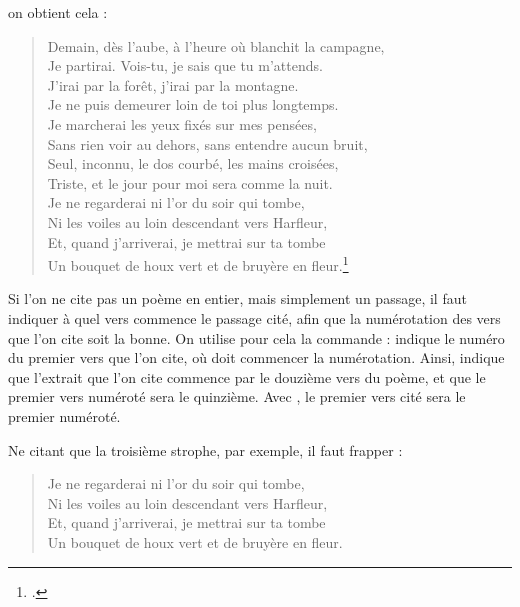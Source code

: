 on obtient cela :

\begin{verse}

Demain, dès l'aube, à l'heure où blanchit la campagne,\\
Je partirai. Vois-tu, je sais que tu m'attends.\\
J'irai par la forêt, j'irai par la montagne.\\
Je ne puis demeurer loin de toi plus longtemps.\\

Je marcherai les yeux fixés sur mes pensées,\\
Sans rien voir au dehors, sans entendre aucun bruit,\\
Seul, inconnu, le dos courbé, les mains croisées,\\
Triste, et le jour pour moi sera comme la nuit.\\

Je ne regarderai ni l'or du soir qui tombe,\\
Ni les voiles au loin descendant vers Harfleur,\\
Et, quand j'arriverai, je mettrai sur ta tombe\\
Un bouquet de houx vert et de bruyère en fleur.\footcite{demain}

\end{verse}



Si l'on ne cite pas un poème en entier, mais simplement un passage, il faut indiquer à quel vers commence le passage cité, afin que la numérotation des vers que l'on cite soit la bonne.
On utilise pour cela la commande  :  indique le numéro du premier vers que l'on cite,  où doit commencer la numérotation. Ainsi,  indique que l'extrait que l'on cite commence par le douzième vers du poème, et que le premier vers numéroté sera le quinzième. 
Avec , le premier vers cité sera le premier numéroté.

Ne citant que la troisième strophe, par exemple, il faut frapper :
\begin{latexcode}
\begin{verse}


Je ne regarderai ni l'or du soir qui tombe,\\
Ni les voiles au loin descendant vers Harfleur,\\
Et, quand j'arriverai, je mettrai sur ta tombe\\
Un bouquet de houx vert et de bruyère en fleur.

\end{verse}
\end{latexcode}

